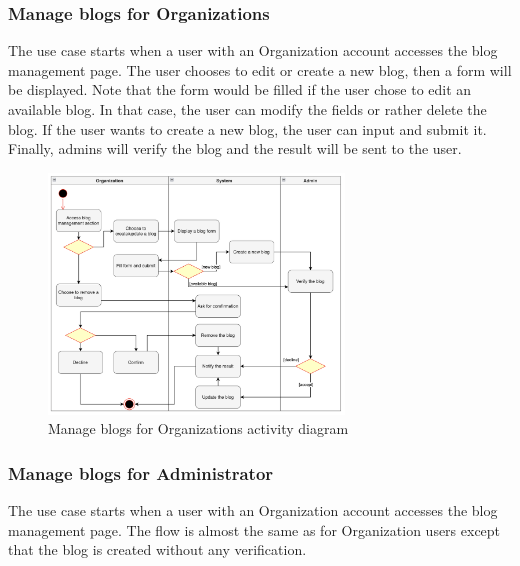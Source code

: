 \subsubsection{Manage blogs for Organizations}

The use case starts when a user with an Organization account accesses the blog management page. The user chooses to edit or create a new blog, then a form will be displayed. Note that the form would be filled if the user chose to edit an available blog. In that case, the user can modify the fields or rather delete the blog. If the user wants to create a new blog, the user can input and submit it. Finally, admins will verify the blog and the result will be sent to the user.

\begin {figure}[H]
\centering
\includegraphics[width=0.7\textwidth]{Figures/manage_blog_org.png}
\caption{Manage blogs for Organizations activity diagram}
\label{fig:manage-blog}
\end{figure}

\subsubsection{Manage blogs for Administrator}

The use case starts when a user with an Organization account accesses the blog management page. The flow is almost the same as for Organization users except that the blog is created without any verification.

